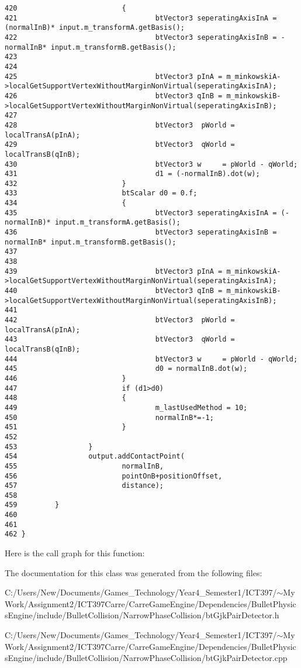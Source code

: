 \begin{Code}
\begin{verbatim}
420                         {
421                                 btVector3 seperatingAxisInA = (normalInB)* input.m_transformA.getBasis();
422                                 btVector3 seperatingAxisInB = -normalInB* input.m_transformB.getBasis();
423                         
424 
425                                 btVector3 pInA = m_minkowskiA->localGetSupportVertexWithoutMarginNonVirtual(seperatingAxisInA);
426                                 btVector3 qInB = m_minkowskiB->localGetSupportVertexWithoutMarginNonVirtual(seperatingAxisInB);
427 
428                                 btVector3  pWorld = localTransA(pInA);  
429                                 btVector3  qWorld = localTransB(qInB);
430                                 btVector3 w     = pWorld - qWorld;
431                                 d1 = (-normalInB).dot(w);
432                         }
433                         btScalar d0 = 0.f;
434                         {
435                                 btVector3 seperatingAxisInA = (-normalInB)* input.m_transformA.getBasis();
436                                 btVector3 seperatingAxisInB = normalInB* input.m_transformB.getBasis();
437                         
438 
439                                 btVector3 pInA = m_minkowskiA->localGetSupportVertexWithoutMarginNonVirtual(seperatingAxisInA);
440                                 btVector3 qInB = m_minkowskiB->localGetSupportVertexWithoutMarginNonVirtual(seperatingAxisInB);
441 
442                                 btVector3  pWorld = localTransA(pInA);  
443                                 btVector3  qWorld = localTransB(qInB);
444                                 btVector3 w     = pWorld - qWorld;
445                                 d0 = normalInB.dot(w);
446                         }
447                         if (d1>d0)
448                         {
449                                 m_lastUsedMethod = 10;
450                                 normalInB*=-1;
451                         } 
452 
453                 }
454                 output.addContactPoint(
455                         normalInB,
456                         pointOnB+positionOffset,
457                         distance);
458 
459         }
460 
461 
462 }
\end{verbatim}
\end{Code}




Here is the call graph for this function:

The documentation for this class was generated from the following files:\begin{CompactItemize}
\item 
C:/Users/New/Documents/Games\_\-Technology/Year4\_\-Semester1/ICT397/$\sim$My Work/Assignment2/ICT397Carre/CarreGameEngine/Dependencies/BulletPhysicsEngine/include/BulletCollision/NarrowPhaseCollision/btGjkPairDetector.h\item 
C:/Users/New/Documents/Games\_\-Technology/Year4\_\-Semester1/ICT397/$\sim$My Work/Assignment2/ICT397Carre/CarreGameEngine/Dependencies/BulletPhysicsEngine/include/BulletCollision/NarrowPhaseCollision/btGjkPairDetector.cpp\end{CompactItemize}
